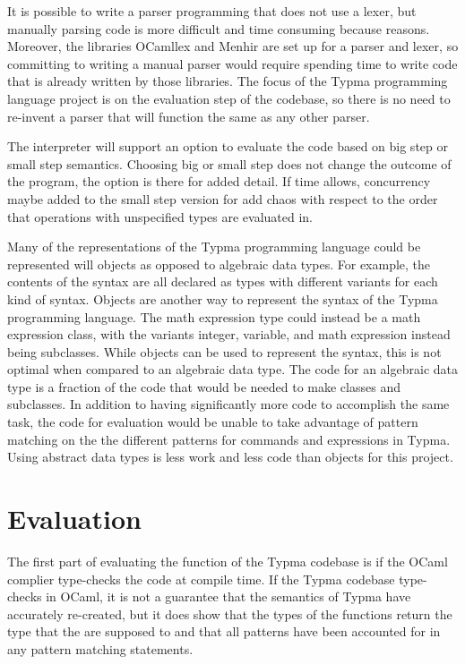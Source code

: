 \documentclass[10pt,twocolumn]{article}
\begin{document}
It is possible to write a parser programming that does not use a lexer, but manually parsing code is more difficult and time consuming because reasons. Moreover, the libraries OCamllex and Menhir are set up for a parser and lexer, so committing to writing a manual parser would require spending time to write code that is already written by those libraries. The focus of the Typma programming language project is on the evaluation step of the codebase, so there is no need to re-invent a parser that will function the same as any other parser.

The interpreter will support an option to evaluate the code based on big step or small step semantics.
Choosing big or small step does not change the outcome of the program, the option is there for added detail. If time allows, concurrency maybe added to the small step version for add chaos with respect to the order that operations with unspecified types are evaluated in.

Many of the representations of the Typma programming language could be represented will objects as opposed to algebraic data types. For example, the contents of the syntax are all declared as types with different variants for each kind of syntax. Objects are another way to represent the syntax of the Typma programming language. The math expression type could instead be a math expression class, with the variants integer, variable, and math expression instead being subclasses. While objects can be used to represent the syntax, this is not optimal when compared to an algebraic data type. The code for an algebraic data type is a fraction of the code that would be needed to make classes and subclasses. In addition to having significantly more code to accomplish the same task, the code for evaluation would be unable to take advantage of pattern matching on the the different patterns for commands and expressions in Typma. Using abstract data types is less work and less code than objects for this project.

\section{Evaluation} 

The first part of evaluating the function of the Typma codebase is if the OCaml complier type-checks the code at compile time. If the Typma codebase type-checks in OCaml, it is not a guarantee that the semantics of Typma have accurately re-created, but it does show that the types of the functions return the type that the are supposed to and that all patterns have been accounted for in any pattern matching statements.
\end{document}
